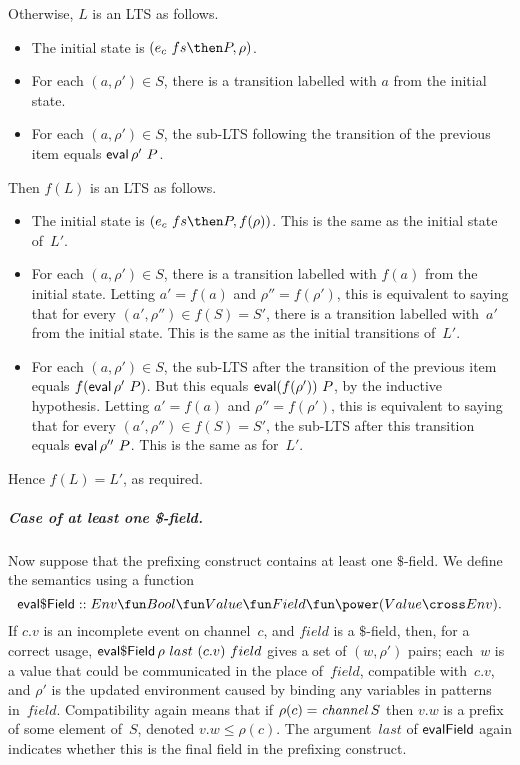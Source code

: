 Otherwise, $L$ is an LTS as follows.
%
\begin{itemize}
\item The initial state is $(e_c~ fs \then P, \rho)$.

\item For each $(a, \rho') \in S$, there is a transition labelled with $a$
  from the initial state.  %

\item For each $(a, \rho') \in S$, the sub-LTS following the transition of
  the previous item equals $\mathop{\sf eval} \rho'~ P$.
\end{itemize}
%
Then $f(L)$ is an  LTS as follows.
%
\begin{itemize}
\item The initial state is $(e_c~fs \then P, f(\rho))$.
  This is the same as the initial state of~$L'$.

\item For each $(a, \rho') \in S$, there is a transition labelled with $f(a)$
  from the initial state.  Letting $a' = f(a)$ and $\rho'' = f(\rho')$,
  this is equivalent to saying that for every $(a',\rho'') \in f(S) = S'$,
  there is a transition labelled with~$a'$ from the initial state.  This is
  the same as the initial transitions of~$L'$.

\item For each $(a, \rho') \in S$, the sub-LTS after the transition of the
  previous item equals $f(\mathop{\sf eval} \rho'~ P)$.  But this equals $\mathop{\sf eval}
  (f(\rho'))~P$, by the inductive hypothesis.  Letting $a' = f(a)$ and
  $\rho'' = f(\rho')$, this is equivalent to saying that for every
  $(a',\rho'') \in f(S) = S'$, the sub-LTS after this transition equals $\mathop{\sf eval}
  \rho''~P$.  This is the same as for~$L'$.
\end{itemize} 
%
Hence $f(L) = L'$, as required. 


\subparagraph{Case of at least one \$-field.}

Now suppose that the prefixing construct contains at least one $\$$-field.
We define the semantics using a function 
\[
\evalDollarField ::
  Env \fun Bool \fun Value \fun Field \fun  \power (Value \cross Env).
\]
If $c.v$ is an incomplete event on channel~$c$, and $field$ is a $\$$-field,
then, for a correct usage, $\mathop{\sf eval\$Field} \rho~last~(c.v)~field$ gives a
set of $(w,\rho')$ pairs; each~$w$ is a value that could be communicated in
the place of~$field$, compatible with~$c.v$, and $\rho'$ is the updated
environment caused by binding any variables in patterns in~$field$.
Compatibility again means that if $\rho(c) = \mathop{\it channel} S$ then $v.w$ is a
prefix of some element of~$S$, denoted $v.w \le \rho(c)$.  The argument~$last$
of $\mathop{\sf evalField}$ again indicates whether this is the final field in the
prefixing construct.

